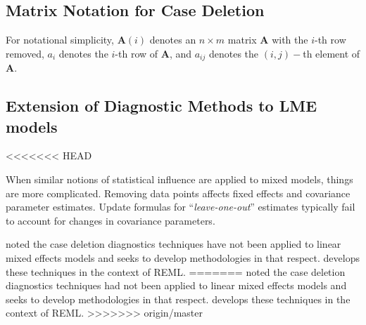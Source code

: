 \documentclass[12pt, a4paper]{report}
\theoremstyle{plain}
\theoremstyle{definition}
\theoremstyle{remark}
\begin{document}
\subsection{Matrix Notation for Case Deletion} %


For notational simplicity, $\boldsymbol{A}(i)$ denotes an $n \times m$ matrix $\boldsymbol{A}$ with the $i$-th row
removed, $a_i$ denotes the $i$-th row of $\boldsymbol{A}$, and $a_{ij}$ denotes the $(i, j)-$th element of $\boldsymbol{A}$.
%



\subsection{Extension of Diagnostic Methods to LME models}

<<<<<<< HEAD

When similar notions of statistical influence are applied to mixed models,
things are more complicated. Removing data points affects fixed effects and covariance parameter estimates.
Update formulas for “\textit{leave-one-out}” estimates typically fail to account for changes in covariance
parameters. 
%
%

\citet{Christiansen} noted the case deletion diagnostics techniques have not been applied to linear mixed effects models and seeks to develop methodologies in that respect. \citet{Christiansen} develops these techniques in the context of REML.
=======
\citet{CPJ} noted the case deletion diagnostics techniques had not been applied to linear mixed effects models and seeks to develop methodologies in that respect. \citet{CPJ} develops these techniques in the context of REML.
>>>>>>> origin/master
\end{document}
